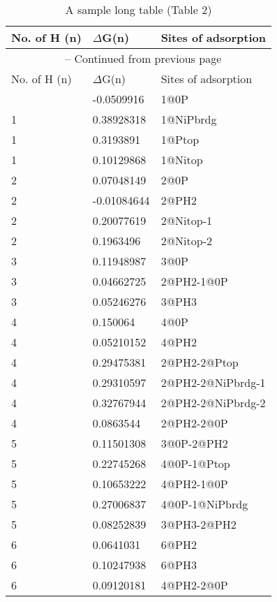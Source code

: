 
\clearpage
\begin{center}
\centering
\begin{longtable}{|l|l|l|}
\caption{A sample long table (Table 2)}
\label{tab:long2} \\
\hline
No. of H (n) & $\Delta$G(n) & Sites of adsorption \\ \hline
\endfirsthead

\multicolumn{3}{c}{\tablename\ \thetable{} -- Continued from previous page} \\ \hline
No. of H (n) & $\Delta$G(n) & Sites of adsorption \\ \hline
\endhead

\hline
\endfoot

\hline
\endlastfoot
1 & -0.0509916 & 1@0P \\ \hline
1 & 0.38928318 & 1@NiPbrdg \\ \hline
1 & 0.3193891 & 1@Ptop \\ \hline
1 & 0.10129868 & 1@Nitop \\ \hline
2 & 0.07048149 & 2@0P \\ \hline
2 & -0.01084644 & 2@PH2 \\ \hline
2 & 0.20077619 & 2@Nitop-1 \\ \hline
2 & 0.1963496 & 2@Nitop-2 \\ \hline
3 & 0.11948987 & 3@0P \\ \hline
3 & 0.04662725 & 2@PH2-1@0P \\ \hline
3 & 0.05246276 & 3@PH3 \\ \hline
4 & 0.150064 & 4@0P \\ \hline
4 & 0.05210152 & 4@PH2 \\ \hline
4 & 0.29475381 & 2@PH2-2@Ptop \\ \hline
4 & 0.29310597 & 2@PH2-2@NiPbrdg-1 \\ \hline
4 & 0.32767944 & 2@PH2-2@NiPbrdg-2 \\ \hline
4 & 0.0863544 & 2@PH2-2@0P \\ \hline
5 & 0.11501308 & 3@0P-2@PH2 \\ \hline
5 & 0.22745268 & 4@0P-1@Ptop \\ \hline
5 & 0.10653222 & 4@PH2-1@0P \\ \hline
5 & 0.27006837 & 4@0P-1@NiPbrdg \\ \hline
5 & 0.08252839 & 3@PH3-2@PH2 \\ \hline
6 & 0.0641031 & 6@PH2 \\ \hline
6 & 0.10247938 & 6@PH3 \\ \hline
6 & 0.09120181 & 4@PH2-2@0P \\ \hline

\end{longtable}
\end{center}
